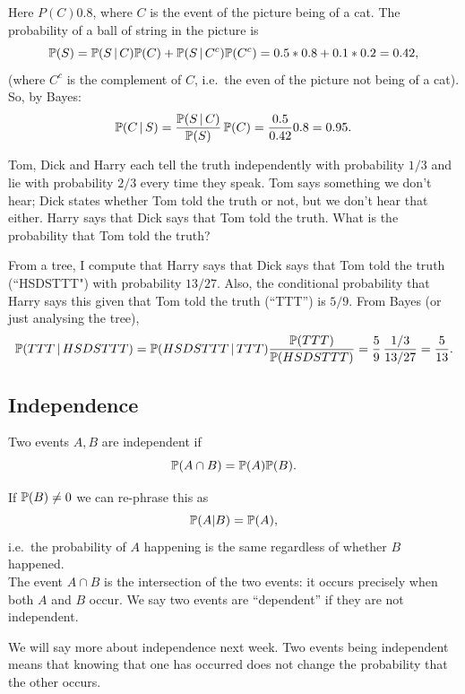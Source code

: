 \begin{sol}
Here $P(C)0.8$, where $C$ is the event of the picture being of a cat. The probability of a ball of string in the picture is 
 \[
   {\mathbb P}(S) = {\mathbb P}(S \, | \, C) {\mathbb P}(C) + {\mathbb P}(S \, | \, C^c) {\mathbb P}(C^c) = 
    0.5 * 0.8 + 0.1 * 0.2 = 0.42,  
 \]
(where $C^c$ is the complement of $C$, i.e.\ the even of the picture not being of a cat).   So, by Bayes: 
 \[
   {\mathbb P}(C \, | \, S) = \frac{{\mathbb P}(S \, | \, C)}{{\mathbb P}(S)} \,{\mathbb P}(C) =
       \frac{0.5}{0.42} 0.8 = 0.95.
 \]
\end{sol}

\begin{exer}
Tom, Dick and Harry each tell the truth independently with probability $1/3$ and lie with probability $2/3$ every time they speak. Tom says something we don't hear; Dick states whether Tom told the truth or not, but we don't hear that either. Harry says that Dick says that Tom told the truth.  What is the probability that Tom told the truth? 
\end{exer}

\begin{sol}
From a tree, I compute that Harry says that Dick says that Tom told the truth (``HSDSTTT") with probability $13/27$. Also, the conditional probability that Harry says this given that Tom told the truth (``TTT'') is $5/9$. From Bayes (or just analysing the tree),
 \[
   {\mathbb P}(TTT \, | \, HSDSTTT ) = {\mathbb P}( HSDSTTT \, | \, TTT) \frac{{\mathbb P}(TTT)}{{\mathbb P}(HSDSTTT)} = \frac59 \, \frac{1/3}{13/27} = \frac5{13}. 
 \]
\end{sol}

\subsection{Independence}
\begin{defn}
Two events $A,B$ are independent if
\[ {\mathbb P}(A \cap B) = {\mathbb P}(A) {\mathbb P}(B).\]
\end{defn}
If ${\mathbb P}(B) \neq 0$ we can re-phrase this as
\[ {\mathbb P}(A \vert B) = {\mathbb P}(A),\]
i.e.\ the probability of $A$ happening is the same regardless of whether $B$ happened. \\ \linebreak
\noindent
The event $A \cap B$ is the intersection of the two events: it occurs precisely when both $A$ and $B$ occur. We say two events are ``dependent'' if they are not independent. 

We will say more about independence next week.  Two events being independent means that knowing that one has occurred does not change the probability that the other occurs.  

